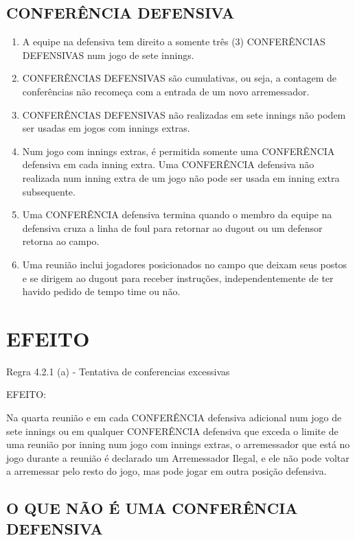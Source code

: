  \subsection{CONFERÊNCIA DEFENSIVA}
\begin{enumerate}[label=(\alph*)]
	\item  A equipe na defensiva tem direito a somente três (3) CONFERÊNCIAS
	 DEFENSIVAS num jogo de sete \glspl{inning}.
	\item  CONFERÊNCIAS DEFENSIVAS são cumulativas, ou seja, a contagem de conferências não recomeça com a entrada de um novo arremessador.
	\item  CONFERÊNCIAS DEFENSIVAS não realizadas em sete \glspl{inning} não podem ser usadas em jogos com \glspl{inning} extras.
	\item  Num jogo com \glspl{inning} extras, é permitida somente uma CONFERÊNCIA  defensiva em cada \gls{inning} extra. Uma CONFERÊNCIA defensiva não realizada num \gls{inning} extra de um jogo não pode ser usada em \gls{inning} extra  subsequente.
	\item  Uma CONFERÊNCIA defensiva termina quando o membro da equipe na  defensiva cruza a linha de \gls{foul} para retornar ao \gls{dugout} ou um defensor retorna  ao campo.

	\item  Uma reunião inclui jogadores posicionados no campo que deixam seus postos e se dirigem ao \gls{dugout} para receber instruções, independentemente de ter havido pedido de tempo \gls{time} ou não.
\end{enumerate}

\section*{EFEITO}

Regra 4.2.1 (a) - Tentativa de conferencias excessivas

 EFEITO:

 Na quarta reunião e em cada CONFERÊNCIA defensiva adicional num jogo de sete \glspl{inning} ou em qualquer CONFERÊNCIA defensiva que exceda o limite de uma reunião por \gls{inning} num jogo com \glspl{inning} extras, o arremessador que está no jogo durante a reunião é declarado um Arremessador Ilegal, e ele não pode voltar a arremessar pelo resto do jogo, mas pode jogar em outra posição defensiva.


\subsection{O QUE NÃO É UMA CONFERÊNCIA DEFENSIVA}


